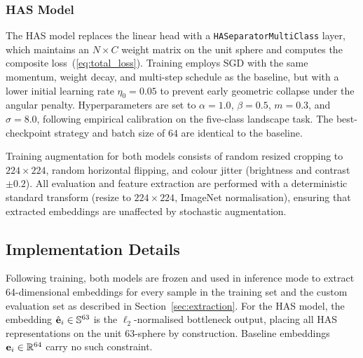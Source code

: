 \subsubsection{HAS Model}

The HAS model replaces the linear head with a
\texttt{HASeparatorMultiClass} layer, which maintains an
$N \times C$ weight matrix on the unit sphere and computes the
composite loss~(\ref{eq:total_loss}).
Training employs SGD with the same momentum, weight decay, and
multi-step schedule as the baseline, but with a lower
initial learning rate $\eta_0 = 0.05$ to prevent early
geometric collapse under the angular penalty.
Hyperparameters are set to $\alpha = 1.0$, $\beta = 0.5$,
$m = 0.3$, and $\sigma = 8.0$, following empirical calibration
on the five-class landscape task.
The best-checkpoint strategy and batch size of $64$ are
identical to the baseline.

Training augmentation for both models consists of random
resized cropping to $224 \times 224$, random horizontal flipping,
and colour jitter (brightness and contrast $\pm 0.2$).
All evaluation and feature extraction are performed with a
deterministic standard transform (resize to $224\times224$,
ImageNet normalisation), ensuring that extracted embeddings are
unaffected by stochastic augmentation.


\subsection{Implementation Details}

Following training, both models are frozen and used in inference
mode to extract 64-dimensional embeddings for every sample in
the training set and the custom evaluation set as described in Section~\ref{sec:extraction}.
For the HAS model, the embedding $\hat{\mathbf{e}}_i \in \mathbb{S}^{63}$ is
the $\ell_2$-normalised bottleneck output, placing all HAS
representations on the unit 63-sphere by construction.
Baseline embeddings $\mathbf{e}_i \in \mathbb{R}^{64}$ carry no such constraint.
